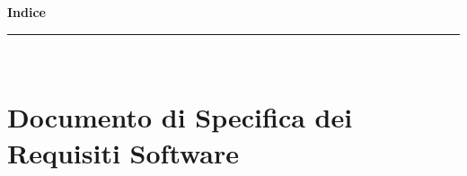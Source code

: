 \documentclass[a4paper,12pt]{article}
\begin{document}
\clearpage
\thispagestyle{empty}
\setcounter{page}{1}

\begin{center}
    \vspace*{0.5cm}
    {\LARGE \textcolor{UninaBlue}{\textbf{Indice}}}\\[0.2cm]
    \rule{0.7\textwidth}{0.5pt}\\[0.3cm]
\end{center}

\renewcommand{\contentsname}{}
{
    \setlength{\parskip}{3pt}
    \tableofcontents
}

\vspace{0.5cm}
\newpage

\section{Documento di Specifica dei Requisiti Software}

\end{document}
